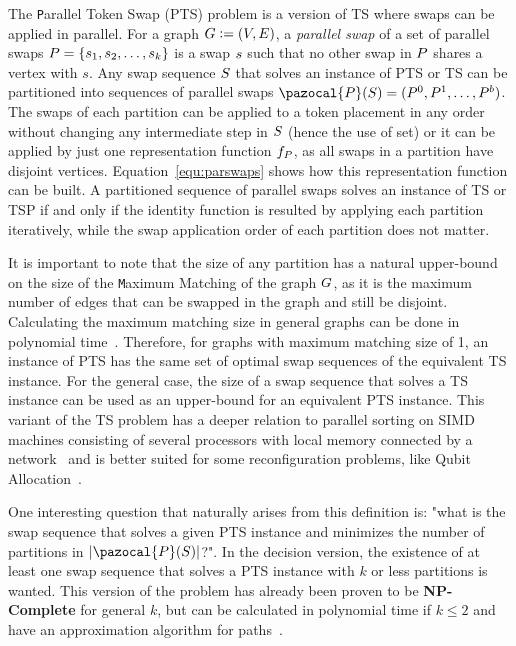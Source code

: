 \documentclass[msc]{ppgccufmg}    %
\begin{document}
The {\texttt Parallel Token Swap} (PTS) problem is a version of TS where swaps can 
be applied in parallel.
For a graph $G \vcentcolon= (V, E)$, a \textit{parallel swap} of 
a set of parallel swaps $P = \{s_1, s_2, \ldots, 
s_k\}$ is a swap $s$ such that no other swap in $P$ shares a 
vertex with $s$.
Any swap sequence $S$ that solves an instance of PTS or TS can be 
partitioned into sequences of parallel swaps $\applyFunc{\pazocal{\swapPSeq}}{S} 
= (\swapPSeq^{0}, \swapPSeq^{1}, \ldots, \swapPSeq^{b})$.
The swaps of each partition can be applied to a token placement in any order 
without changing any intermediate step in $S$ (hence the use of set) or 
it can be applied by just one representation function $f_{P}$, as 
all swaps in a partition have disjoint vertices.
Equation~\ref{equ:parswaps} shows how this representation function can be built.
A partitioned sequence of parallel swaps solves an instance of TS or TSP if and 
only if the identity function is resulted by applying each partition 
iteratively, while the swap application order of each partition does not matter.


It is important to note that the size of any partition has a natural upper-bound 
on the size of the {\texttt Maximum Matching} of the graph $G$, as it is the
maximum number of edges that can be swapped in the graph and still be disjoint.
Calculating the maximum matching size in general graphs can be done in 
polynomial time~\citep{Edmonds:1965}.
Therefore, for graphs with maximum matching size of 1, an instance of PTS has the
same set of optimal swap sequences of the equivalent TS instance.
For the general case, the size of a swap sequence that solves a TS instance can be
used as an upper-bound for an equivalent PTS instance.
This variant of the TS problem has a deeper relation to parallel sorting on SIMD
machines consisting of several processors with local memory connected by a 
network~\citep{Yamanaka:2015,Kawahara:2017} and is better suited for some 
reconfiguration problems, like Qubit Allocation~\citep
{Siraichi:2018,Siraichi:2019}.

One interesting question that naturally arises from this definition is: "what 
is the swap sequence that solves a given PTS instance and minimizes the number 
of partitions in $\sizeof{\applyFunc{\pazocal{\swapPSeq}}{\swapSeq}}$?".
In the decision version, the existence of at least one swap sequence that solves 
a PTS instance with $k$ or less partitions is wanted.
This version of the problem has already been proven to be \textbf{NP-Complete}
for general $k$, but can be calculated in polynomial time if $k \leq 2$ and
have an approximation algorithm for paths~\citep{Kawahara:2017}.
\end{document}
